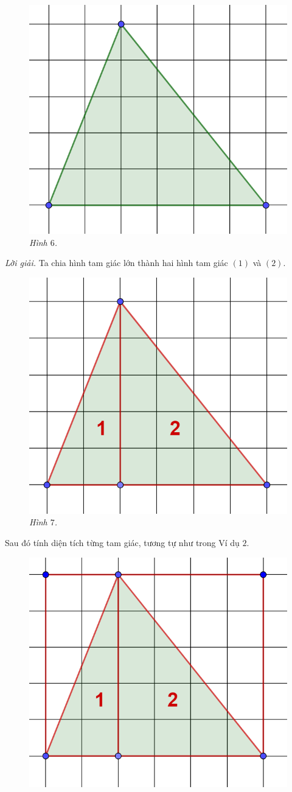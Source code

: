 \begin{multicols}{2}
	\begin{figure}[H]
		\centering
		\vspace*{-5pt}
		\captionsetup{labelformat= empty, justification=centering}
		\includegraphics[width=0.5\linewidth]{6}
		\caption{\small\textit{\color{toancuabi}Hình $6$.}}
		\vspace*{-10pt}
	\end{figure}
	\textit{Lời giải.} Ta chia hình tam giác lớn thành hai hình tam giác $(1)$ và $(2)$.
	\begin{figure}[H]
		\centering
		\vspace*{-5pt}
		\captionsetup{labelformat= empty, justification=centering}
		\includegraphics[width=0.5\linewidth]{7}
		\caption{\small\textit{\color{toancuabi}Hình $7$.}}
		\vspace*{-10pt}
	\end{figure}
	Sau đó tính diện tích từng tam giác, tương tự như trong Ví dụ $2$.
	\begin{figure}[H]
		\centering
		\vspace*{-5pt}
		\captionsetup{labelformat= empty, justification=centering}
		\includegraphics[width=0.5\linewidth]{8}

\end{figure}
\end{multicols}
